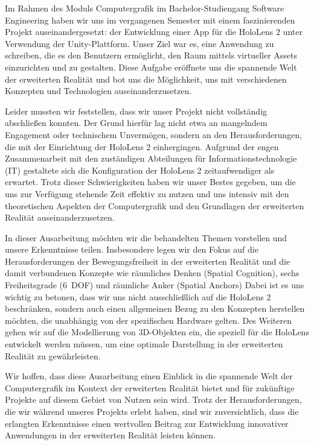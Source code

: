 Im Rahmen des Moduls Computergrafik im Bachelor-Studiengang Software Engineering haben wir uns im vergangenen Semester mit einem faszinierenden Projekt auseinandergesetzt: der Entwicklung einer App für die HoloLens 2 unter Verwendung der Unity-Plattform.
Unser Ziel war es, eine Anwendung zu schreiben, die es den Benutzern ermöglicht, den Raum mittels virtueller Assets einzurichten und zu gestalten.
Diese Aufgabe eröffnete uns die spannende Welt der erweiterten Realität und bot uns die Möglichkeit, uns mit verschiedenen Konzepten und Technologien auseinanderzusetzen.


Leider mussten wir feststellen, dass wir unser Projekt nicht vollständig abschließen konnten.
Der Grund hierfür lag nicht etwa an mangelndem Engagement oder technischem Unvermögen, sondern an den Herausforderungen, die mit der Einrichtung der HoloLens 2 einhergingen.
Aufgrund der engen Zusammenarbeit mit den zuständigen Abteilungen für Informationstechnologie (IT) gestaltete sich die Konfiguration der HoloLens 2 zeitaufwendiger als erwartet.
Trotz dieser Schwierigkeiten haben wir unser Bestes gegeben, um die uns zur Verfügung stehende Zeit effektiv zu nutzen und uns intensiv mit den theoretischen Aspekten der Computergrafik und den Grundlagen der erweiterten Realität auseinanderzusetzen.


In dieser Ausarbeitung möchten wir die behandelten Themen vorstellen und unsere Erkenntnisse teilen.
Insbesondere legen wir den Fokus auf die Herausforderungen der Bewegungsfreiheit in der erweiterten Realität und die damit verbundenen Konzepte wie räumliches Denken (Spatial Cognition), sechs Freiheitsgrade (6~DOF) und räumliche Anker (Spatial Anchors)
Dabei ist es uns wichtig zu betonen, dass wir uns nicht ausschließlich auf die HoloLens 2 beschränken, sondern auch einen allgemeinen Bezug zu den Konzepten herstellen möchten, die unabhängig von der spezifischen Hardware gelten.
Des Weiteren gehen wir auf die Modellierung von 3D-Objekten ein, die speziell für die HoloLens entwickelt werden müssen, um eine optimale Darstellung in der erweiterten Realität zu gewährleisten.


Wir hoffen, dass diese Ausarbeitung einen Einblick in die spannende Welt der Computergrafik im Kontext der erweiterten Realität bietet und für zukünftige Projekte auf diesem Gebiet von Nutzen sein wird.
Trotz der Herausforderungen, die wir während unseres Projekts erlebt haben, sind wir zuversichtlich, dass die erlangten Erkenntnisse einen wertvollen Beitrag zur Entwicklung innovativer Anwendungen in der erweiterten Realität leisten können.
